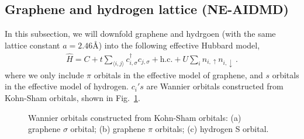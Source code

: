 \documentclass[aps, prb]{revtex4-1}
\begin{document}
\subsection{Graphene and hydrogen lattice (NE-AIDMD)}
In this subsection, we will downfold graphene and hydrgoen (with the same lattice constant $a=2.46$\AA) into the following effective Hubbard model, 
\begin{eqnarray}\label{eq:hubbard}
\hat{H} = C + t\sum_{\langle i,j\rangle}c_{i, \sigma}^\dagger c_{j, \sigma} + \text{h.c.} + U\sum_{i}n_{i, \uparrow}n_{i, \downarrow}\,. 
\end{eqnarray}
where we only include $\pi$ orbitals in the effective model of graphene, and $s$ orbitals in the effective model of hydrogen. $c_{i}'s$ are Wannier orbitals constructed from Kohn-Sham orbitals, shown in Fig.~\ref{fig:wan}.
\begin{figure}[hbt]
  \centering  
       \caption{Wannier orbitals constructed from Kohn-Sham orbitals: (a) graphene $\sigma$ orbital; (b) graphene $\pi$ orbitals; (c) hydrogen S orbital. }
\label{fig:wan}
\end{figure}
\end{document}
